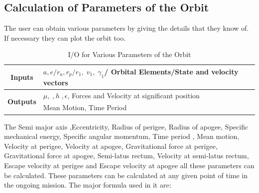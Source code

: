 \subsection{Calculation of Parameters of the Orbit}
The user can obtain various parameters by giving the details that they know of. If necessary they can plot the orbit too.
\begin{table}[H]
\centering
\begin{tabular}{@{}rl@{}}
\toprule
\multicolumn{1}{c}{\textbf{Inputs}} & $a,e/r_a, r_p/r_1,\;v_1,\;\gamma_1$/ Orbital Elements/State and velocity vectors \\ \midrule
\multirow{2}{*}{\textbf{Outputs}}   & $\mu,\;,h\;,\epsilon$, Forces and Velocity at significant position               \\ \cmidrule(l){2-2} 
                           & Mean Motion, Time Period                                                         \\ \bottomrule
\end{tabular}
\caption{I/O for Various Parameters of the Orbit}
\label{vpco}
\end{table}
The Semi major axis ,Eccentricity, Radius of perigee, Radius of apogee, Specific mechanical energy, Specific angular momentum, Time period , Mean motion, Velocity at perigee, Velocity at apogee, Gravitational force at perigee, Gravitational force at apogee, Semi-latus rectum, Velocity at semi-latus rectum, Escape velocity at perigee and Escape velocity at apogee all these parameters can be calculated. These parameters can be calculated at any given point of time in the ongoing mission.
The major formula used in it are:\\

